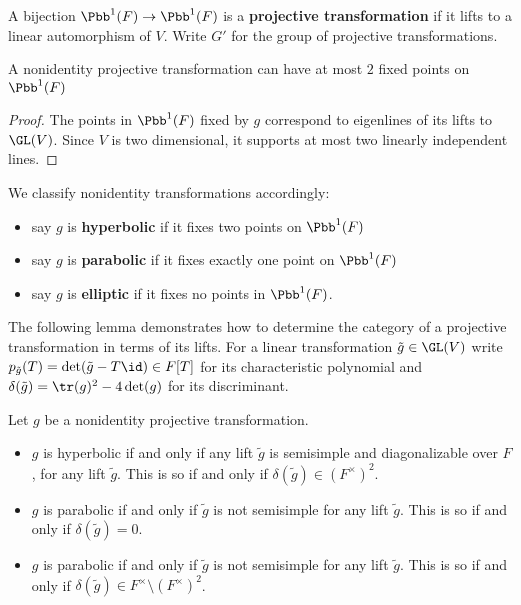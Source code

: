 \documentclass{amsart}
\begin{document}
A bijection $\Pbb^{1}(F) \to \Pbb^{1}(F)$ is a \textbf{projective transformation} if it lifts to a linear automorphism of $V$. Write $G'$ for the group of projective transformations.


\begin{lemma}
	A nonidentity projective transformation can have at most $2$ fixed points on $\Pbb^{1}(F)$
\end{lemma}
\begin{proof}
	The points in $\Pbb^{1}(F)$ fixed by $g$ correspond to eigenlines of its lifts to $\GL(V)$. Since $V$ is two dimensional, it supports at most two linearly independent lines.
\end{proof}
We classify nonidentity transformations accordingly:
\begin{itemize}
	\item say $g$ is \textbf{hyperbolic} if it fixes two points on $\Pbb^{1}(F)$
	\item say $g$ is \textbf{parabolic} if it fixes exactly one point on $\Pbb^{1}(F)$
	\item say $g$ is \textbf{elliptic} if it fixes no points in $\Pbb^{1}(F)$.
\end{itemize}
The following lemma demonstrates how to determine the category of a projective transformation in terms of its lifts. For a linear transformation $\tilde{g} \in \GL(V)$ write $p_{\tilde{g}}(T) = \det(\tilde{g}-T \id) \in F[T]$ for its characteristic polynomial and $\delta(\tilde{g}) = \tr(g)^{2} -4 \det(g)$ for its discriminant.
\begin{lemma}
	Let $g$ be a nonidentity projective transformation.
	\begin{itemize}
		\item $g$ is hyperbolic if and only if any lift $\tilde{g}$ is semisimple and diagonalizable over $F$, for any lift $\tilde{g}$. This is so  if and only if $\delta(\tilde{g})  \in (F^{\times})^{2}$.
		\item $g$ is parabolic if and only if $\tilde{g}$ is not semisimple for any lift $\tilde{g}$. This is so if and only if $\delta(\tilde{g})= 0$.
		\item $g$ is parabolic if and only if $\tilde{g}$ is not semisimple for any lift $\tilde{g}$. This is so if and only if $\delta(\tilde{g}) \in F^\times \setminus (F^{\times})^{2}$.
	\end{itemize}
\end{lemma}


\end{document}
